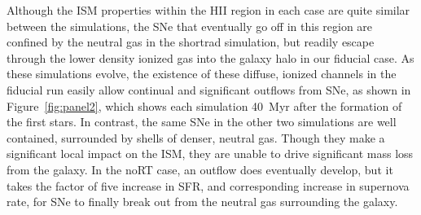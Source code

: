 \documentclass[twocolumn]{aastex62}
\begin{document}
Although the ISM properties within the HII region in each case are quite similar between the simulations, the SNe that eventually go off in this region are confined by the neutral gas in the shortrad simulation, but readily escape through the lower density ionized gas into the galaxy halo in our fiducial case. As these simulations evolve, the existence of these diffuse, ionized channels in the fiducial run easily allow continual and significant outflows from SNe, as shown in  Figure~\ref{fig:panel2}, which shows each simulation 40~Myr after the formation of the first stars. In contrast, the same SNe in the other two simulations are well contained, surrounded by shells of denser, neutral gas. Though they make a significant local impact on the ISM, they are unable to drive significant mass loss from the galaxy. In the noRT case, an outflow does eventually develop, but it takes the factor of five increase in SFR, and corresponding increase in supernova rate, for SNe to finally break out from the neutral gas surrounding the galaxy. 


\end{document}
